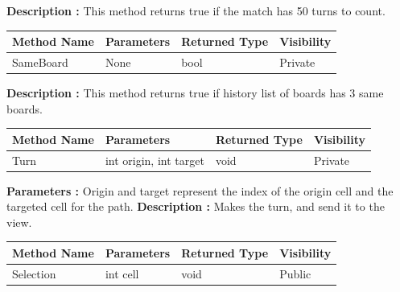 \documentclass[12pt]{article}
\begin{document}
    \textbf{Description :} This method returns true if the match has 50 turns to count.

    \begin{table}[H]
        \begin{tabular}{|l|l|l|l|}
            \hline
            \rowcolor[HTML]{EFEFEF}
            \cellcolor[HTML]{EFEFEF}\textbf{Method Name} & \textbf{Parameters} & \textbf{Returned Type} & \textbf{Visibility} \\ \hline
            SameBoard                                    & None                & bool                   & Private             \\ \hline
        \end{tabular}
    \end{table}

    \textbf{Description :} This method returns true if history list of boards has 3 same boards.

    \begin{table}[H]
        \begin{tabular}{|l|l|l|l|}
            \hline
            \rowcolor[HTML]{EFEFEF}
            \cellcolor[HTML]{EFEFEF}\textbf{Method Name} & \textbf{Parameters}    & \textbf{Returned Type} & \textbf{Visibility} \\ \hline
            Turn                                         & int origin, int target & void                   & Private             \\ \hline
        \end{tabular}
    \end{table}

    \textbf{Parameters :} Origin and target represent the index of the origin cell and the targeted cell for the path.
    \textbf{Description :} Makes the turn, and send it to the view.

    \begin{table}[H]
        \begin{tabular}{|l|l|l|l|}
            \hline
            \rowcolor[HTML]{EFEFEF}
            \cellcolor[HTML]{EFEFEF}\textbf{Method Name} & \textbf{Parameters} & \textbf{Returned Type} & \textbf{Visibility} \\ \hline
            Selection                                    & int cell            & void                   & Public              \\ \hline
        \end{tabular}
    \end{table}
\end{document}
